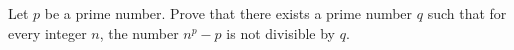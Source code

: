 Let $p$ be a prime number. Prove that there exists a prime number $q$ such that for every integer $n$,  the number $n^p-p$ is not divisible by $q$.